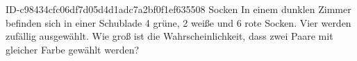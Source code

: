 \begin{exercise}
      {ID-c98434cfc06df7d05d4d1adc7a2bf0f1ef635508}
      {Socken}
  \ifproblem\problem
    In einem dunklen Zimmer befinden sich in einer Schublade 4 grüne, 2 weiße und
    6 rote Socken. Vier werden zufällig ausgewählt. Wie groß ist die
    Wahrscheinlichkeit, dass zwei Paare mit gleicher Farbe gewählt werden?
  \fi
\end{exercise}
